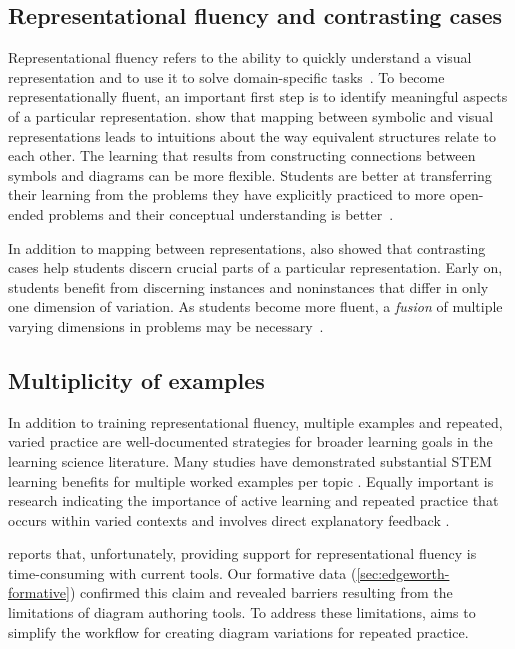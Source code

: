 \subsection{Representational fluency and contrasting cases}

Representational fluency refers to the ability to quickly understand a visual representation and to use it to solve domain-specific tasks~\cite{multipleReps}. To become representationally fluent, an important first step is to identify meaningful aspects of a particular representation. \citet{kellman_perceptual_2010} show that mapping between symbolic and visual representations leads to intuitions about the way equivalent structures relate to each other. The learning that results from constructing connections between symbols and diagrams can be more flexible. Students are better at transferring their learning from the problems they have explicitly practiced to more open-ended problems and their conceptual understanding is better~\cite{25learning}. 

In addition to mapping between representations, \citet{marton_sameness_2006} also showed that contrasting cases help students discern crucial parts of a particular representation. Early on, students benefit from discerning instances and noninstances that differ in only one dimension of variation. As students become more fluent, a \emph{fusion} of multiple varying dimensions in problems may be necessary~\cite{chik_simultaneity_2004}.

\subsection{Multiplicity of examples}

In addition to training representational fluency, multiple examples and repeated, varied practice are well-documented strategies for broader learning goals in the learning science literature. Many studies have demonstrated substantial STEM learning benefits for multiple worked examples per topic \cite{pashler_organizing_2007}. Equally important is research indicating the importance of active learning \cite{chi_icap_2014,deslauriers_measuring_2019} and repeated practice \cite{deliberatePractice,schnackenberg_learner_1998} that occurs within varied contexts \cite{PV94,rohrer_shuffling_2007} and involves direct explanatory feedback \cite{kellman_perceptual_2010}.

\citet{rau_conditions_2017} reports that, unfortunately, providing support for representational fluency is time-consuming with current tools. Our formative data (\cref{sec:edgeworth-formative}) confirmed this claim and revealed barriers resulting from the limitations of diagram authoring tools. To address these limitations, \Edgeworth aims to simplify the workflow for creating diagram variations for repeated practice. 


